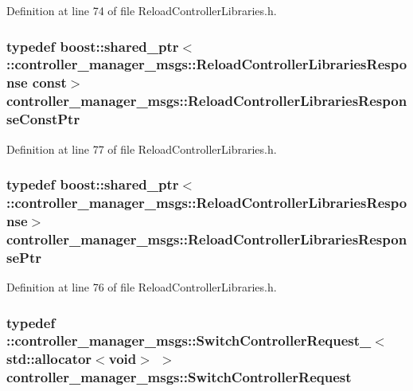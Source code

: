 \-Definition at line 74 of file \-Reload\-Controller\-Libraries.\-h.

\subsubsection[{\-Reload\-Controller\-Libraries\-Response\-Const\-Ptr}]{\setlength{\rightskip}{0pt plus 5cm}typedef boost\-::shared\-\_\-ptr$<$ \-::{\bf controller\-\_\-manager\-\_\-msgs\-::\-Reload\-Controller\-Libraries\-Response} const$>$ {\bf controller\-\_\-manager\-\_\-msgs\-::\-Reload\-Controller\-Libraries\-Response\-Const\-Ptr}}\label{namespacecontroller__manager__msgs_ad70166f6ee9ae33cccb5cbbb2eabf185}


\-Definition at line 77 of file \-Reload\-Controller\-Libraries.\-h.

\subsubsection[{\-Reload\-Controller\-Libraries\-Response\-Ptr}]{\setlength{\rightskip}{0pt plus 5cm}typedef boost\-::shared\-\_\-ptr$<$ \-::{\bf controller\-\_\-manager\-\_\-msgs\-::\-Reload\-Controller\-Libraries\-Response}$>$ {\bf controller\-\_\-manager\-\_\-msgs\-::\-Reload\-Controller\-Libraries\-Response\-Ptr}}\label{namespacecontroller__manager__msgs_aebfd7c16c64809aac6f7f6050d0197f3}


\-Definition at line 76 of file \-Reload\-Controller\-Libraries.\-h.

\subsubsection[{\-Switch\-Controller\-Request}]{\setlength{\rightskip}{0pt plus 5cm}typedef \-::{\bf controller\-\_\-manager\-\_\-msgs\-::\-Switch\-Controller\-Request\-\_\-}$<$std\-::allocator$<$void$>$ $>$ {\bf controller\-\_\-manager\-\_\-msgs\-::\-Switch\-Controller\-Request}}\label{namespacecontroller__manager__msgs_a3556658a6f6fbef2d5db2a2874a2ba94}


